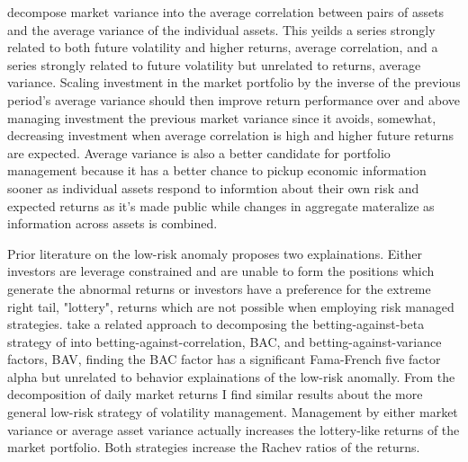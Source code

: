 \citet{pollet_average_2010} decompose market variance into the average correlation between pairs of assets and the average variance of the individual assets. This yeilds a series strongly related to both future volatility and higher returns, average correlation, and a series strongly related to future volatility but unrelated to returns, average variance. Scaling investment in the market portfolio by the inverse of the previous period’s average variance should then improve return performance over and above managing investment the previous market variance since it avoids, somewhat, decreasing investment when average correlation is high and higher future returns are expected. Average variance is also a better candidate for portfolio management because it has a better chance to pickup economic information sooner as individual assets respond to informtion about their own risk and expected returns as it's made public while changes in aggregate materalize as information across assets is combined.\citep{campbell1997econometrics,campbell_have_2001} 

Prior literature on the low-risk anomaly proposes two explainations. Either investors are leverage constrained and are unable to form the positions which generate the abnormal returns or investors have a preference for the extreme right tail, "lottery", returns which are not possible when employing risk managed strategies. \citet{asness_betting_2018} take a related approach to decomposing the betting-against-beta strategy of \citet{frazzini_betting_2014} into betting-against-correlation, BAC, and betting-against-variance factors, BAV, finding the BAC factor has a significant Fama-French five factor alpha but unrelated to behavior explainations of the low-risk anomally.\citep{fama_dissecting_2016} From the decomposition of daily market returns I find similar results about the more general low-risk strategy of volatility management. Management by either market variance or average asset variance actually increases the lottery-like returns of the market portfolio. Both strategies increase the Rachev ratios of the returns.

